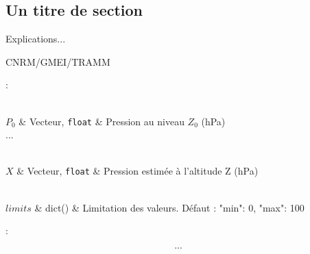   \begin{boxedverbatim}
  \section{Un titre de section}

   

  Explications...

  \bigskip
  


  

  CNRM/GMEI/TRAMM

  \end{boxedverbatim}

\smallbreak
{} :

  \begin{boxedverbatim}
  \begin{tabarg}
  \\
  \hline
  $P_0$ & Vecteur, \texttt{float} &  Pression au niveau $Z_0$ (hPa)\\ 
  ...
  \end{tabarg}
  
  \medskip
  
  \begin{tabarg}
  \\
  \hline
  $X$ & Vecteur, \texttt{float} & Pression estimée \`a l'altitude Z (hPa)\\
  \end{tabarg}
  
  \begin{tabarg}
  \\
  \hline
  $limits$  & dict()    & Limitation des valeurs. Défaut : "min": 0, "max": 100\\
  \end{tabarg}

\medskip

  \end{boxedverbatim}

\smallbreak
{} :

  \begin{boxedverbatim}
  \[
  ...
  \]
  \end{boxedverbatim}

